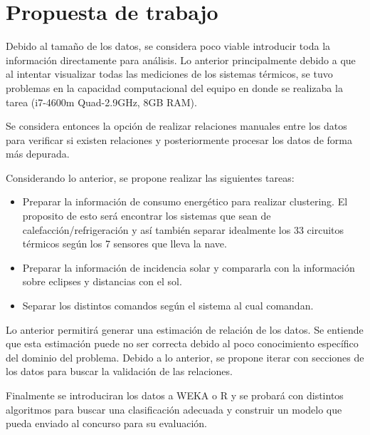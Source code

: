 \documentclass[../Main.tex]{subfiles}
\begin{document}
\section{Propuesta de trabajo}
Debido al tamaño de los datos, se considera poco viable introducir toda la información directamente para análisis. Lo anterior principalmente debido a que al intentar visualizar todas las mediciones de los sistemas térmicos, se tuvo problemas en la capacidad computacional del equipo en donde se realizaba la tarea (i7-4600m Quad-2.9GHz, 8GB RAM).
\newline \par
Se considera entonces la opción de realizar relaciones manuales entre los datos para verificar si existen relaciones y posteriormente procesar los datos de forma más depurada.
\newline \par
Considerando lo anterior, se propone realizar las siguientes tareas:
\begin{itemize}
	\item Preparar la información de consumo energético para realizar clustering. El proposito de esto será encontrar los sistemas que sean de calefacción/refrigeración y así también separar idealmente los 33 circuitos térmicos según los 7 sensores que lleva la nave.
    \item Preparar la información de incidencia solar y compararla con la información sobre eclipses y distancias con el sol.
    \item Separar los distintos comandos según el sistema al cual comandan.
\end{itemize}

Lo anterior permitirá generar una estimación de relación de los datos. Se entiende que esta estimación puede no ser correcta debido al poco conocimiento específico del dominio del problema. Debido a lo anterior, se propone iterar con secciones de los datos para buscar la validación de las relaciones.
\newline \par
Finalmente se introduciran los datos a WEKA o R y se probará con distintos algoritmos para buscar una clasificación adecuada y construir un modelo que pueda enviado al concurso para su evaluación.
\end{document}
